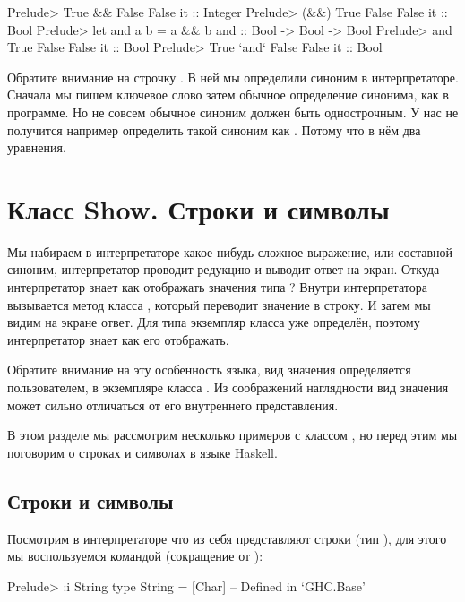 \begin{code}
Prelude> True && False
False
it :: Integer
Prelude> (&&) True False
False
it :: Bool
Prelude> let and a b = a && b
and :: Bool -> Bool -> Bool
Prelude> and True False
False
it :: Bool
Prelude> True `and` False
False
it :: Bool
\end{code}

Обратите внимание на строчку .
В ней мы определили синоним в интерпретаторе. 
Сначала мы пишем ключевое слово 
 затем 
обычное определение синонима, как в программе.
Но не совсем обычное синоним должен быть однострочным.
У нас не получится например определить такой
синоним как . Потому что в нём два уравнения.


\section{Класс Show. Строки и символы}

Мы набираем в интерпретаторе какое-нибудь
сложное выражение, или составной синоним, интерпретатор
проводит редукцию и выводит ответ на экран. 
Откуда интерпретатор знает как отображать
значения типа ? Внутри интерпретатора 
вызывается метод класса , который переводит
значение в строку. И затем мы видим на экране ответ.  
Для типа  экземпляр класса  уже определён,
поэтому интерпретатор знает как его отображать.

Обратите внимание на эту особенность языка, вид значения
определяется пользователем, в экземпляре класса . 
Из соображений наглядности вид значения может сильно отличаться 
от его внутреннего представления. 

В этом разделе мы рассмотрим несколько примеров с
классом , но перед этим мы поговорим о строках и
символах в языке Haskell. 

\subsection{Строки и символы}

Посмотрим в интерпретаторе что из себя представляют строки 
 (тип ),
для этого мы воспользуемся командой  (сокращение от ):

\begin{code}
Prelude> :i String
type String = [Char] 	-- Defined in `GHC.Base'
\end{code}

